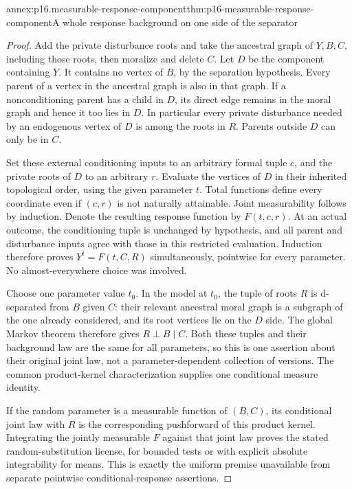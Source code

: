 \begin{annexitem}{annex:p16.measurable-response-component}{thm:p16-measurable-response-component}{A whole response background on one side of the separator}
\begin{proof}
Add the private disturbance roots and take the ancestral graph of
\(Y,B,C\), including those roots, then moralize and delete \(C\).
Let \(D\) be the component containing \(Y\). It contains no vertex
of \(B\), by the separation hypothesis. Every parent of a vertex
in the ancestral graph is also in that graph. If a nonconditioning
parent has a child in \(D\), its direct edge remains in the moral
graph and hence it too lies in \(D\). In particular every private
disturbance needed by an endogenous vertex of \(D\) is among the
roots in \(R\). Parents outside \(D\) can only be in \(C\).

Set these external conditioning inputs to an arbitrary formal tuple
\(c\), and the private roots of \(D\) to an arbitrary \(r\).
Evaluate the vertices of \(D\) in their inherited topological order,
using the given parameter \(t\). Total functions define every
coordinate even if \((c,r)\) is not naturally attainable. Joint
measurability follows by induction. Denote the resulting response
function by \(F(t,c,r)\). At an actual outcome, the conditioning
tuple is unchanged by hypothesis, and all parent and disturbance
inputs agree with those in this restricted evaluation. Induction
therefore proves \(Y^t=F(t,C,R)\) simultaneously, pointwise for
every parameter. No almost-everywhere choice was involved.

Choose one parameter value \(t_0\). In the model at \(t_0\),
the tuple of roots \(R\) is d-separated from \(B\) given \(C\):
their relevant ancestral moral graph is a subgraph of the one already
considered, and its root vertices lie on the \(D\) side. The global
Markov theorem therefore gives \(R\perp B\mid C\). Both these
tuples and their background law are the same for all parameters,
so this is one assertion about their original joint law, not a
parameter-dependent collection of versions. The common product-kernel
characterization supplies one conditional measure identity.

If the random parameter is a measurable function of \((B,C)\), its
conditional joint law with \(R\) is the corresponding pushforward
of this product kernel. Integrating the jointly measurable \(F\)
against that joint law proves the stated random-substitution license,
for bounded tests or with explicit absolute integrability for means.
This is exactly the uniform premise unavailable from separate
pointwise conditional-response assertions.
\end{proof}
\end{annexitem}

